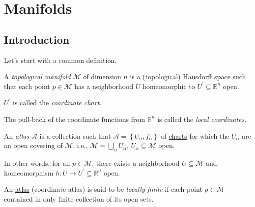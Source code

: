 \chapter{Manifolds}
\section{Introduction}
Let's start with a common definition.
\begin{definition}\label{def:topological-manifold}
	A \emph{topological manifold} \(\mathcal{M} \) of dimension \(n\) is a (topological) Hausdorff space such that each point \(p\in \mathcal{M} \) has a neighborhood \(U\) homeomorphic to \(U^\prime \subseteq \mathbb{R} ^n\) open.
	\begin{definition}\label{def:coordinate-chart}
		\(U^\prime \) is called the \emph{coordinate chart}.
	\end{definition}
	\begin{definition}\label{def:local-coordinate}
		The pull-back of the coordinate functions from \(\mathbb{R} ^n\) is called the \emph{local coordinates}.
	\end{definition}
	\begin{definition}[Atlas]\label{def:atlas}
		An \emph{atlas} \(\mathcal{A} \) is a collection such that \(\mathcal{A} =\left\{ U_\alpha , f_\alpha  \right\} \) of \hyperref[def:coordinate-chart]{charts} for which the \(U_\alpha \) are an open covering of \(\mathcal{M} \), i.e., \(\mathcal{M} = \bigcup_{\alpha } U_\alpha \), \(U_\alpha \subseteq \mathcal{M} \) open.
	\end{definition}
\end{definition}

In other words, for all \(p\in \mathcal{M} \), there exists a neighborhood \(U \subseteq \mathcal{M} \) and homeomorphism \(h\colon U \to U^\prime \subseteq \mathbb{R} ^n\) open.

\begin{definition}\label{def:locally-finite}
	An \hyperref[def:atlas]{atlas} (coordinate atlas) is said to be \emph{locally finite} if each point \(p\in \mathcal{M} \) contained in only finite collection of its open sets.
\end{definition}

